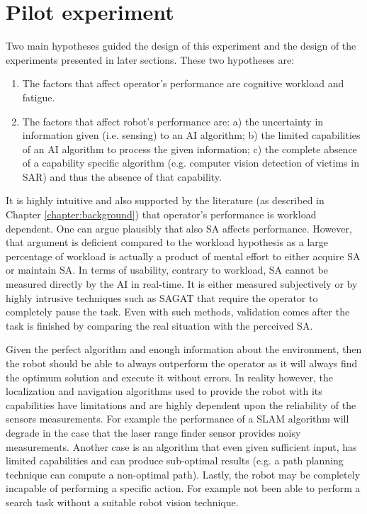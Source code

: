 \documentclass[a4paper,12pt,oneside,openright]{bhamthesis}
\begin{document}
\section{Pilot experiment}
\label{section:chapter3-pilot}
Two main hypotheses guided the design of this experiment and the design of the experiments presented in later sections. These two hypotheses are:

\begin{enumerate}
	\item The factors that affect operator's performance are cognitive workload and fatigue.
	\item The factors that affect robot's performance are: a) the uncertainty in information given (i.e. sensing) to an AI algorithm; b) the limited capabilities of an AI algorithm to process the given information; c) the complete absence of a capability specific algorithm (e.g. computer vision detection of victims in SAR) and thus the absence of that capability. 
\end{enumerate}

It is highly intuitive and also supported by the literature (as described in Chapter \ref{chapter:background}) that operator's performance is workload dependent. One can argue plausibly that also SA affects performance. However, that argument is deficient compared to the workload hypothesis as a large percentage of workload is actually a product of mental effort to either acquire SA or maintain SA. In terms of usability, contrary to workload, SA cannot be measured directly by the AI in real-time. It is either measured subjectively or by highly intrusive techniques such as SAGAT \citep{Endsley1988} that require the operator to completely pause the task. Even with such methods, validation comes after the task is finished by comparing the real situation with the perceived SA. 

Given the perfect algorithm and enough information about the environment, then the robot should be able to always outperform the operator as it will always find the optimum solution and execute it without errors. In reality however, the localization and navigation algorithms used to provide the robot with its capabilities have limitations and are highly dependent upon the reliability of the sensors measurements. For example the performance of a SLAM algorithm will degrade in the case that the laser range finder sensor provides noisy measurements. Another case is an algorithm that even given sufficient input, has limited capabilities and can produce sub-optimal results (e.g. a path planning technique can compute a non-optimal path). Lastly, the robot may be completely incapable of performing a specific action. For example not been able to perform a search task without a suitable robot vision technique.
\end{document}
